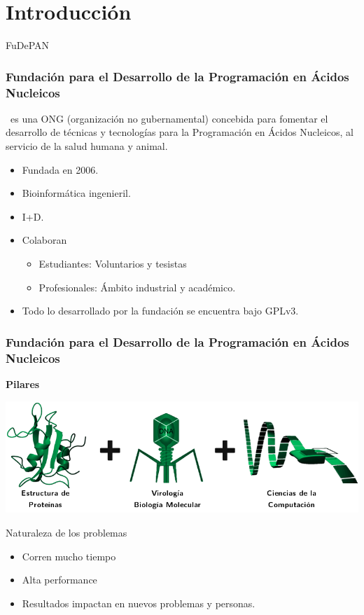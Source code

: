 \section{Introducción}

\begin{subsection}{FuDePAN}
 
\begin{frame}\frametitle{\small{Fundación para el Desarrollo de la Programación en Ácidos Nucleicos}}
  \fude\ es una ONG (organización no gubernamental) concebida para fomentar el desarrollo de técnicas y tecnologías
  para la Programación en \'Acidos Nucleicos, al servicio de la salud humana y animal.\\[0.2cm]
  \pause
  \begin{itemize}
    \item Fundada en 2006.
    \item Bioinformática ingenieril.
    \item I+D.
    \item Colaboran
        \begin{itemize}
            \item Estudiantes: Voluntarios y tesistas
            \item Profesionales: Ámbito industrial y académico.
        \end{itemize}

    \item Todo lo desarrollado por la fundación se encuentra bajo GPLv3.
  \end{itemize}
\end{frame}

\begin{frame}\frametitle{\small{Fundación para el Desarrollo de la Programación en Ácidos Nucleicos}}
    \large{\textbf{Pilares}}
    \begin{center}
        \includegraphics[scale=0.30]{images/fudesuma.png}
    \end{center}
    \pause
    \begin{block}{Naturaleza de los problemas}
        \begin{itemize}
            \item Corren mucho tiempo
            \item Alta performance
            \item Resultados impactan en nuevos problemas y personas.
        \end{itemize}
    \end{block}
\end{frame}

\end{subsection}

